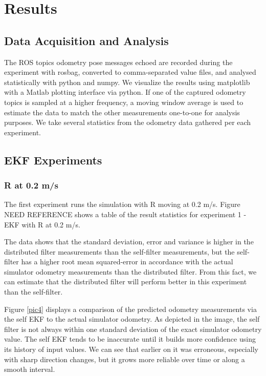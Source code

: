 \documentclass[conference]{IEEEtran} \usepackage[T1]{fontenc} \usepackage[backend=biber, style=ieee]{biblatex}
\begin{document}
\section{Results} \label{Results} %
\subsection{Data Acquisition and Analysis} \label{Data Acquisition and Analysis}
The ROS topics odometry pose messages echoed are 
recorded during the experiment with rosbag, converted to comma-separated value files, and analysed statistically with 
python and numpy. We visualize the results using matplotlib with a Matlab plotting interface via python. If one of the 
captured odometry topics is sampled at a higher frequency, a moving window average is used to estimate the data to match 
the other measurements one-to-one for analysis purposes. We take several statistics from the odometry data gathered per each experiment. 

\subsection{EKF Experiments} \label{EKF Experiments}
\subsubsection{R at 0.2 m/s} \label{EKF .2}
The first experiment runs the simulation with R moving at 0.2 m/s. Figure NEED REFERENCE shows a table of the result statistics for experiment 1 - EKF 
with R at 0.2 m/s. 


The data shows that the standard deviation, error and variance is higher in the distributed filter measurements than the 
self-filter measurements, but the self-filter has a higher root mean squared-error in accordance with the actual simulator odometry measurements than the distributed filter. From this fact, we can estimate that the distributed filter will perform better in this experiment than the self-filter. 

Figure \ref{pic4} displays a comparison of the predicted odometry measurements via the self EKF to the actual simulator 
odometry. As depicted in the image, the self filter is not always within one standard deviation of the exact simulator 
odometry value. The self EKF tends to be inaccurate until it builds more confidence using its history of input values. We can see that earlier on it
was erroneous, especially with sharp direction changes, but it grows more reliable over time or along a smooth interval.
\end{document}
